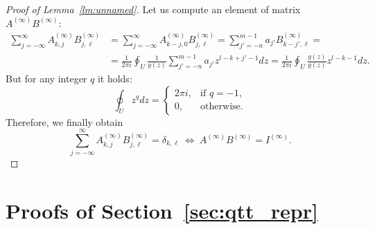 \documentclass[a4paper]{article}
\newcommand{\Binf}{B^{(\infty)}}
\newcommand{\Ainf}{A^{(\infty)}}
\begin{document}
	\begin{proof}[Proof of Lemma~\ref{lm:unnamed}]
	Let us compute an element of matrix $\Ainf \Binf$:
	\begin{align*}
	\sum_{j=-\infty}^{\infty}\Ainf_{k, j}\Binf_{j, \ell}
	&=
	\sum_{j=-\infty}^{\infty}\Ainf_{k-j, 0}\Binf_{j, \ell}
	=
	\sum_{j'=-n}^{m-1}a_{j'}\Binf_{k-j', \ell}
	=\\&=
	\frac{1}{2\pi i}\oint_U\frac{1}{g(z)}\sum_{j'=-n}^{m-1}a_{j'}z^{l-k+j'-1}dz
	=
	\frac{1}{2\pi i}\oint_U\frac{g(z)}{g(z)}z^{l-k-1}dz.
	\end{align*}
	But for any integer $q$ it holds:
	\[
	\oint_U z^{q}dz
	=
	\begin{cases}
	2\pi i,&\text{if } q = -1,\\
	0,&\text{otherwise}.
	\end{cases}
	\]
	Therefore, we finally obtain
	\[
	\sum_{j=-\infty}^{\infty}\Ainf_{k, j}\Binf_{j, \ell} = \delta_{k,\ell} ~\Longleftrightarrow~\Ainf \Binf = I^{(\infty)}.
	\]
	\end{proof}
	
\section{Proofs of Section~\ref{sec:qtt_repr}} \label{app:qtt_repr}
\end{document}

